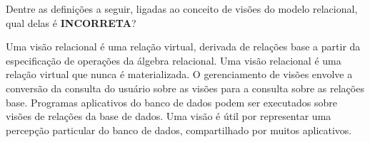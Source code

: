\documentclass[12pt, addpoints]{exam}
\begin{document}
\begin{questions}
\question

Dentre as definições a seguir, ligadas ao conceito de visões do modelo relacional, qual delas é \textbf{INCORRETA}?


\begin{choices}
\choice Uma visão relacional é uma relação virtual, derivada de relações base a partir da especificação de operações da álgebra relacional.
\choice Uma visão relacional é uma relação virtual que nunca é materializada.
\choice O gerenciamento de visões envolve a conversão da consulta do usuário sobre as visões para a consulta sobre as relações base.
\choice Programas aplicativos do banco de dados podem ser executados sobre visões de relações da base de dados.
\choice Uma visão é útil por representar uma percepção particular do banco de dados, compartilhado por muitos aplicativos.
\end{choices}



    \end{questions}
    
\end{document}
